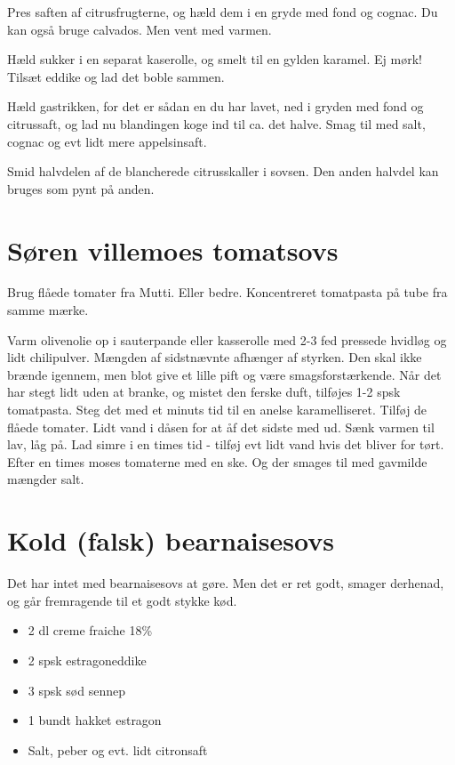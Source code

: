\documentclass[
  letterpaper,
  DIV=11,
  numbers=noendperiod]{scrreprt}
\providecommand{\tightlist}{%
  \setlength{\itemsep}{0pt}\setlength{\parskip}{0pt}}\usepackage{longtable,booktabs,array}
\begin{document}
Pres saften af citrusfrugterne, og hæld dem i en gryde med fond og
cognac. Du kan også bruge calvados. Men vent med varmen.

Hæld sukker i en separat kaserolle, og smelt til en gylden karamel. Ej
mørk! Tilsæt eddike og lad det boble sammen.

Hæld gastrikken, for det er sådan en du har lavet, ned i gryden med fond
og citrussaft, og lad nu blandingen koge ind til ca. det halve. Smag til
med salt, cognac og evt lidt mere appelsinsaft.

Smid halvdelen af de blancherede citrusskaller i sovsen. Den anden
halvdel kan bruges som pynt på anden.

\hypertarget{suxf8ren-villemoes-tomatsovs}{%
\section{Søren villemoes tomatsovs}\label{suxf8ren-villemoes-tomatsovs}}

Brug flåede tomater fra Mutti. Eller bedre. Koncentreret tomatpasta på
tube fra samme mærke.

Varm olivenolie op i sauterpande eller kasserolle med 2-3 fed pressede
hvidløg og lidt chilipulver. Mængden af sidstnævnte afhænger af styrken.
Den skal ikke brænde igennem, men blot give et lille pift og være
smagsforstærkende. Når det har stegt lidt uden at branke, og mistet den
ferske duft, tilføjes 1-2 spsk tomatpasta. Steg det med et minuts tid
til en anelse karamelliseret. Tilføj de flåede tomater. Lidt vand i
dåsen for at åf det sidste med ud. Sænk varmen til lav, låg på. Lad
simre i en times tid - tilføj evt lidt vand hvis det bliver for tørt.
Efter en times moses tomaterne med en ske. Og der smages til med
gavmilde mængder salt.

\hypertarget{kold-falsk-bearnaisesovs}{%
\section{Kold (falsk) bearnaisesovs}\label{kold-falsk-bearnaisesovs}}

Det har intet med bearnaisesovs at gøre. Men det er ret godt, smager
derhenad, og går fremragende til et godt stykke kød.~

\begin{itemize}
\tightlist
\item
  2 dl creme fraiche 18\%
\item
  2 spsk estragoneddike
\item
  3 spsk sød sennep
\item
  1 bundt hakket estragon
\item
  Salt, peber og evt. lidt citronsaft
\end{itemize}
\end{document}
